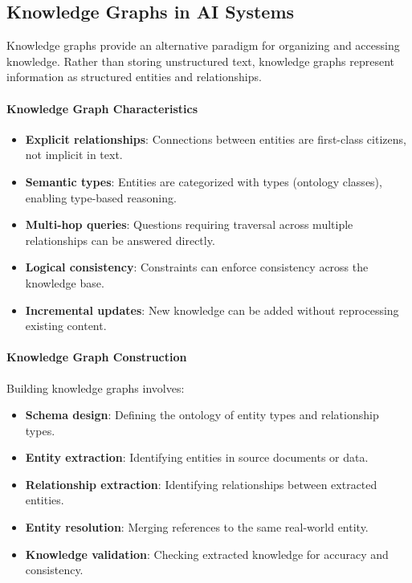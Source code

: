 \subsection{Knowledge Graphs in AI Systems}

Knowledge graphs provide an alternative paradigm for organizing and accessing knowledge. Rather than storing unstructured text, knowledge graphs represent information as structured entities and relationships.

\paragraph{Knowledge Graph Characteristics}

\begin{itemize}
    \item \textbf{Explicit relationships}: Connections between entities are first-class citizens, not implicit in text.
    
    \item \textbf{Semantic types}: Entities are categorized with types (ontology classes), enabling type-based reasoning.
    
    \item \textbf{Multi-hop queries}: Questions requiring traversal across multiple relationships can be answered directly.
    
    \item \textbf{Logical consistency}: Constraints can enforce consistency across the knowledge base.
    
    \item \textbf{Incremental updates}: New knowledge can be added without reprocessing existing content.
\end{itemize}

\paragraph{Knowledge Graph Construction}

Building knowledge graphs involves:

\begin{itemize}
    \item \textbf{Schema design}: Defining the ontology of entity types and relationship types.
    
    \item \textbf{Entity extraction}: Identifying entities in source documents or data.
    
    \item \textbf{Relationship extraction}: Identifying relationships between extracted entities.
    
    \item \textbf{Entity resolution}: Merging references to the same real-world entity.
    
    \item \textbf{Knowledge validation}: Checking extracted knowledge for accuracy and consistency.
\end{itemize}

